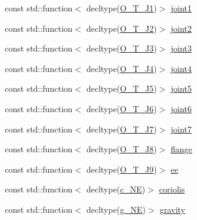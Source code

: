 \begin{DoxyCompactItemize}
\item 
const std\+::function$<$ decltype(\hyperlink{libfcimodels_8h_ac2b2c464a5e5c2f9142e442844f50874}{O\+\_\+\+T\+\_\+\+J1})$>$ \hyperlink{classfranka_1_1ModelLibrary_a7683563473a41174beaaeb0d7cbdc8fb}{joint1}
\item 
const std\+::function$<$ decltype(\hyperlink{libfcimodels_8h_a006f34ae0fbae39fcdee9254033e9d93}{O\+\_\+\+T\+\_\+\+J2})$>$ \hyperlink{classfranka_1_1ModelLibrary_aec6f1e37865014df93fefed447b9d844}{joint2}
\item 
const std\+::function$<$ decltype(\hyperlink{libfcimodels_8h_aee9c6555cf5d94752cfee040755e362d}{O\+\_\+\+T\+\_\+\+J3})$>$ \hyperlink{classfranka_1_1ModelLibrary_a863bedfd4810a18b2a6c73d0a05f7309}{joint3}
\item 
const std\+::function$<$ decltype(\hyperlink{libfcimodels_8h_a2d90f09392f9d34a83ab9812edadd7a6}{O\+\_\+\+T\+\_\+\+J4})$>$ \hyperlink{classfranka_1_1ModelLibrary_a18423f2eeee2cea52a270fcec47ba981}{joint4}
\item 
const std\+::function$<$ decltype(\hyperlink{libfcimodels_8h_a299a5e5c9ec0eb604e2f37ceeb9a1ed6}{O\+\_\+\+T\+\_\+\+J5})$>$ \hyperlink{classfranka_1_1ModelLibrary_ac622a201cd72ab734fddc052fb42bb97}{joint5}
\item 
const std\+::function$<$ decltype(\hyperlink{libfcimodels_8h_a6b60358c31837d93f81758afad043863}{O\+\_\+\+T\+\_\+\+J6})$>$ \hyperlink{classfranka_1_1ModelLibrary_ac940683ad7922d4efc0e82f4c1188ab2}{joint6}
\item 
const std\+::function$<$ decltype(\hyperlink{libfcimodels_8h_a2f154a8b8432c7a206ce0f1ffc5b4335}{O\+\_\+\+T\+\_\+\+J7})$>$ \hyperlink{classfranka_1_1ModelLibrary_af2be813fd1fd1d91d0009993b4bd068a}{joint7}
\item 
const std\+::function$<$ decltype(\hyperlink{libfcimodels_8h_ada18495666330695c6605732368d3d6e}{O\+\_\+\+T\+\_\+\+J8})$>$ \hyperlink{classfranka_1_1ModelLibrary_a538628841d211a1db3e491ffe19e6fa1}{flange}
\item 
const std\+::function$<$ decltype(\hyperlink{libfcimodels_8h_a472426c06cf7bb8b89546d39e00d1bbd}{O\+\_\+\+T\+\_\+\+J9})$>$ \hyperlink{classfranka_1_1ModelLibrary_aa2acabf8d02fceb0eda60898bc4937b6}{ee}
\item 
const std\+::function$<$ decltype(\hyperlink{libfcimodels_8h_a5a32397c0bb46fe289468cd700b4e905}{c\+\_\+\+NE})$>$ \hyperlink{classfranka_1_1ModelLibrary_aad26e1d65eddd882c2b987397553b389}{coriolis}
\item 
const std\+::function$<$ decltype(\hyperlink{libfcimodels_8h_a0aaaba780142c32b2311100b51bc9cc0}{g\+\_\+\+NE})$>$ \hyperlink{classfranka_1_1ModelLibrary_a13d4490081efdb7bfd46f32a12a2b007}{gravity}
\end{DoxyCompactItemize}
